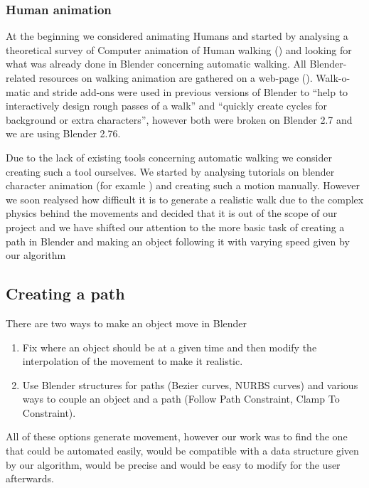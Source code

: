 \subsubsection{Human animation}

\par At the beginning we considered animating Humans and started by analysing a theoretical survey of Computer animation of Human walking (\cite{th_walking}) and looking for what was already done in Blender concerning automatic walking. All Blender-related resources on walking animation are gathered on a web-page (\cite{blwikiwalking}). Walk-o-matic and stride add-ons were used in previous versions of Blender to ``help to interactively design rough passes of a walk'' and ``quickly create cycles for background or extra characters'', however both were broken on Blender 2.7 and we are using Blender 2.76. 

\par Due to the lack of existing tools concerning automatic walking we consider creating such a tool ourselves. We started by analysing tutorials on blender character animation (for examle \cite{tuto_walk}) and creating such a motion manually. However we soon realysed how difficult it is to generate a realistic walk due to the complex physics behind the movements and decided that it is out of the scope of our project and we have shifted our attention to the more basic task of creating a path in Blender and making an object following it with varying speed given by our algorithm

\subsection{Creating a path}

\par There are two ways to make an object move in Blender
\begin{enumerate}
\item Fix where an object should be at a given time and then modify the interpolation of the movement to make it realistic.  
\item Use Blender structures for paths (Bezier curves, NURBS curves) and various ways to couple an object and a path (Follow Path Constraint, Clamp To Constraint).
\end{enumerate} 

All of these options generate movement, however our work was to find the one that could be automated easily, would be compatible with a data structure given by our algorithm, would be precise and would be easy to modify for the user afterwards. 

